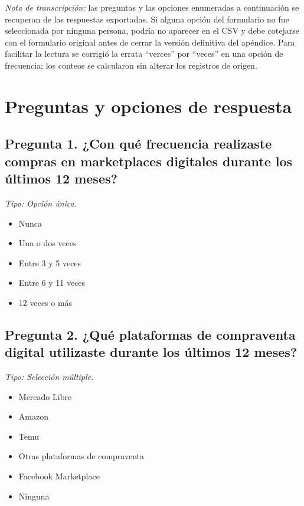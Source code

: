 \noindent\textit{Nota de transcripción:} las preguntas y las opciones enumeradas a continuación se recuperan de las respuestas exportadas. Si alguna opción del formulario no fue seleccionada por ninguna persona, podría no aparecer en el CSV y debe cotejarse con el formulario original antes de cerrar la versión definitiva del apéndice. Para facilitar la lectura se corrigió la errata ``verces'' por ``veces'' en una opción de frecuencia; los conteos se calcularon sin alterar los registros de origen.

\section{Preguntas y opciones de respuesta}
\subsection*{Pregunta 1. ¿Con qué frecuencia realizaste compras en marketplaces digitales durante los últimos 12 meses?}
\noindent\textit{Tipo: Opción única.}
\begin{itemize}\setlength\itemsep{1pt}
\item Nunca
\item Una o dos veces
\item Entre 3 y 5 veces
\item Entre 6 y 11 veces
\item 12 veces o más
\end{itemize}
\subsection*{Pregunta 2. ¿Qué plataformas de compraventa digital utilizaste durante los últimos 12 meses?}
\noindent\textit{Tipo: Selección múltiple.}
\begin{itemize}\setlength\itemsep{1pt}
\item Mercado Libre
\item Amazon
\item Temu
\item Otras plataformas de compraventa
\item Facebook Marketplace
\item Ninguna
\end{itemize}
